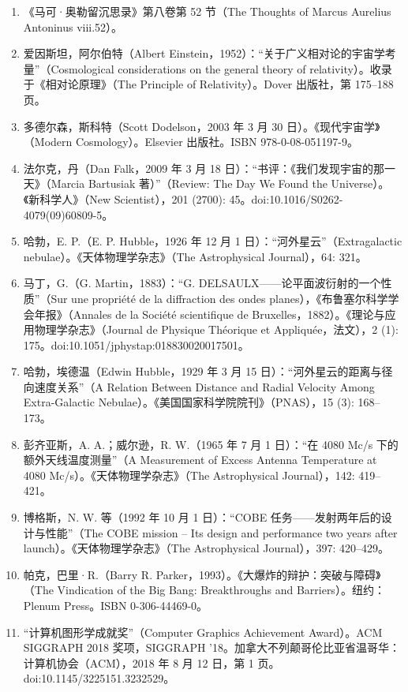 \begin{enumerate}
\item 《马可·奥勒留沉思录》第八卷第 52 节（The Thoughts of Marcus Aurelius Antoninus viii.52）。  
\item 爱因斯坦，阿尔伯特（Albert Einstein，1952）：“关于广义相对论的宇宙学考量”（Cosmological considerations on the general theory of relativity）。收录于《相对论原理》（The Principle of Relativity）。Dover 出版社，第 175–188 页。  
\item 多德尔森，斯科特（Scott Dodelson，2003 年 3 月 30 日）。《现代宇宙学》（Modern Cosmology）。Elsevier 出版社。ISBN 978-0-08-051197-9。 
\item 法尔克，丹（Dan Falk，2009 年 3 月 18 日）：“书评：《我们发现宇宙的那一天》（Marcia Bartusiak 著）”（Review: The Day We Found the Universe）。《新科学人》（New Scientist），201 (2700): 45。doi:10.1016/S0262-4079(09)60809-5。  
\item 哈勃，E. P.（E. P. Hubble，1926 年 12 月 1 日）：“河外星云”（Extragalactic nebulae）。《天体物理学杂志》（The Astrophysical Journal），64: 321。  
\item 马丁，G.（G. Martin，1883）：“G. DELSAULX——论平面波衍射的一个性质”（Sur une propriété de la diffraction des ondes planes），《布鲁塞尔科学学会年报》（Annales de la Société scientifique de Bruxelles，1882）。《理论与应用物理学杂志》（Journal de Physique Théorique et Appliquée，法文），2 (1): 175。doi:10.1051/jphystap:018830020017501。  
\item 哈勃，埃德温（Edwin Hubble，1929 年 3 月 15 日）：“河外星云的距离与径向速度关系”（A Relation Between Distance and Radial Velocity Among Extra-Galactic Nebulae）。《美国国家科学院院刊》（PNAS），15 (3): 168–173。  
\item 彭齐亚斯，A. A.；威尔逊，R. W.（1965 年 7 月 1 日）：“在 4080 Mc/s 下的额外天线温度测量”（A Measurement of Excess Antenna Temperature at 4080 Mc/s）。《天体物理学杂志》（The Astrophysical Journal），142: 419–421。  
\item 博格斯，N. W. 等（1992 年 10 月 1 日）：“COBE 任务——发射两年后的设计与性能”（The COBE mission – Its design and performance two years after launch）。《天体物理学杂志》（The Astrophysical Journal），397: 420–429。  
\item 帕克，巴里·R.（Barry R. Parker，1993）。《大爆炸的辩护：突破与障碍》（The Vindication of the Big Bang: Breakthroughs and Barriers）。纽约：Plenum Press。ISBN 0-306-44469-0。  
\item “计算机图形学成就奖”（Computer Graphics Achievement Award）。ACM SIGGRAPH 2018 奖项，SIGGRAPH '18。加拿大不列颠哥伦比亚省温哥华：计算机协会（ACM），2018 年 8 月 12 日，第 1 页。doi:10.1145/3225151.3232529。  

\end{enumerate}
